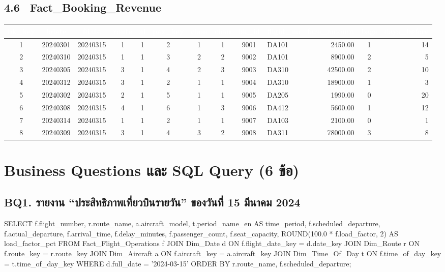 \documentclass[11pt]{article}
\begin{document}
\subsection*{4.6 \ Fact_Booking_Revenue}
{\footnotesize
\begin{adjustbox}{max width=\linewidth}
\begin{tabular}{@{}c c c c c c c c c l r c r@{}}
\toprule
\rowcolor{tblHead}
\textcolor{white}{bk_key} & \textcolor{white}{bdate} & \textcolor{white}{fdate} &
\textcolor{white}{route} & \textcolor{white}{al} & \textcolor{white}{pax_key} &
\textcolor{white}{class} & \textcolor{white}{chan} & \textcolor{white}{bk_id} &
\textcolor{white}{flight_no} & \textcolor{white}{fare_amount} & \textcolor{white}{bags} &
\textcolor{white}{days_before}\\
\midrule
1 & 20240301 & 20240315 & 1 & 1 & 2 & 1 & 1 & 9001 & DA101 &  2450.00 & 1 & 14\\
2 & 20240310 & 20240315 & 1 & 1 & 3 & 2 & 2 & 9002 & DA101 &  8900.00 & 2 &  5\\
3 & 20240305 & 20240315 & 3 & 1 & 4 & 2 & 3 & 9003 & DA310 & 42500.00 & 2 & 10\\
4 & 20240312 & 20240315 & 3 & 1 & 2 & 1 & 1 & 9004 & DA310 & 18900.00 & 1 &  3\\
5 & 20240302 & 20240315 & 2 & 1 & 5 & 1 & 1 & 9005 & DA205 &  1990.00 & 0 & 20\\
6 & 20240308 & 20240315 & 4 & 1 & 6 & 1 & 3 & 9006 & DA412 &  5600.00 & 1 & 12\\
7 & 20240314 & 20240315 & 1 & 1 & 2 & 1 & 1 & 9007 & DA103 &  2100.00 & 0 &  1\\
8 & 20240309 & 20240315 & 3 & 1 & 4 & 3 & 2 & 9008 & DA311 & 78000.00 & 3 &  8\\
\bottomrule
\end{tabular}
\end{adjustbox}}

\clearpage
\section{Business Questions และ SQL Query (6 ข้อ)}

\subsection*{BQ1. รายงาน ``ประสิทธิภาพเที่ยวบินรายวัน'' ของวันที่ 15 มีนาคม 2024}
\begin{sql}
SELECT f.flight_number, r.route_name, a.aircraft_model, t.period_name_en AS time_period,
       f.scheduled_departure, f.actual_departure, f.arrival_time,
       f.delay_minutes, f.passenger_count, f.seat_capacity,
       ROUND(100.0 * f.load_factor, 2) AS load_factor_pct
FROM Fact_Flight_Operations f
JOIN Dim_Date d ON f.flight_date_key = d.date_key
JOIN Dim_Route r ON f.route_key = r.route_key
JOIN Dim_Aircraft a ON f.aircraft_key = a.aircraft_key
JOIN Dim_Time_Of_Day t ON f.time_of_day_key = t.time_of_day_key
WHERE d.full_date = '2024-03-15'
ORDER BY r.route_name, f.scheduled_departure;
\end{sql}
\end{document}

